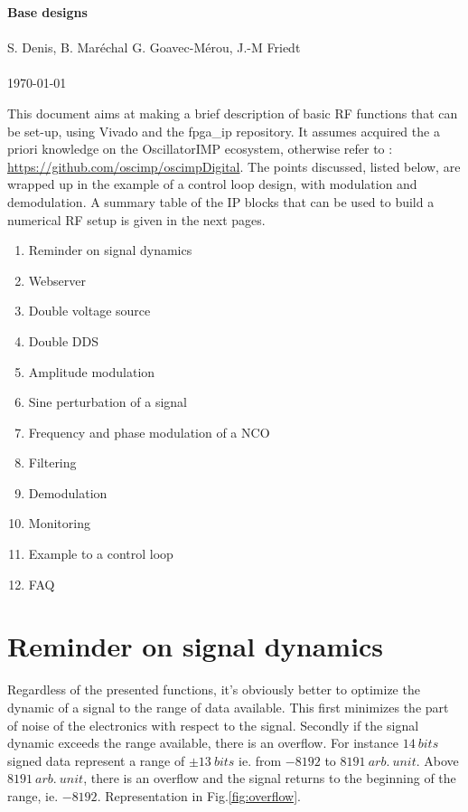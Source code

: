 \documentclass[12pt,oneside]{article}
\begin{document}
\begin{center}
{\bf \Large Base designs} \\ \ \\
S. Denis, B. Maréchal G. Goavec-M\'erou, J.-M Friedt \\ \ \\ \today
\end{center}

This document aims at making a brief description of basic RF functions that can be set-up, using Vivado and the fpga\_ip repository. It assumes acquired the a priori knowledge on the OscillatorIMP ecosystem, otherwise refer to : \href{[https://github.com/oscimp/oscimpDigital]}{https://github.com/oscimp/oscimpDigital}.
The points discussed, listed below, are wrapped up in the example of a control loop design, with modulation and demodulation. A summary table of the IP blocks that can be used to build a numerical RF setup is given in the next pages. 

\begin{multicols}{2}
\begin{enumerate}
\setlength\itemsep{-0.1cm}
\item Reminder on signal dynamics
\item Webserver
\item Double voltage source
\item Double DDS
\item Amplitude modulation
\item Sine perturbation of a signal
\item Frequency and phase modulation of a NCO
\item Filtering
\item Demodulation
\item Monitoring
\item Example to a control loop
\item FAQ
\end{enumerate}
\end{multicols}


\section{Reminder on signal dynamics}

Regardless of the presented functions, it's obviously better to optimize the dynamic of a signal to the range of data available. This first minimizes the part of noise of the electronics with respect to the signal. Secondly if the signal dynamic exceeds the range available, there is an overflow. For instance $14~bits$ signed data represent a range of $\pm 13~bits$ ie. from $-8192$ to $8191~arb.~unit$. Above $8191~arb.~unit$, there is an overflow and the signal returns to the beginning of the range, ie. $-8192$. Representation in Fig.\ref{fig:overflow}.
\end{document}
